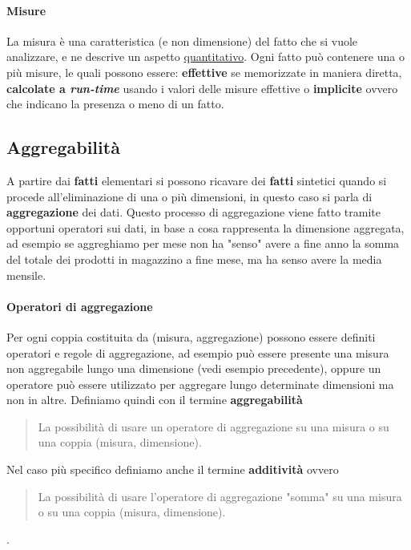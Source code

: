         \paragraph{Misure} La misura è una caratteristica (e non dimensione) del fatto che si vuole analizzare, e ne descrive un aspetto \underline{quantitativo}. Ogni fatto può contenere una o più misure, le quali possono essere: \textbf{effettive} se memorizzate in maniera diretta, \textbf{calcolate a \textit{run-time}} usando i valori delle misure effettive o \textbf{implicite} ovvero che indicano la presenza o meno di un fatto.
    \subsection{Aggregabilità} 
        A partire dai \textbf{fatti} elementari si possono ricavare dei \textbf{fatti} sintetici quando si procede all'eliminazione di una o più dimensioni, in questo caso si parla di \textbf{aggregazione} dei dati. Questo processo di aggregazione viene fatto tramite opportuni operatori sui dati, in base a cosa rappresenta la dimensione aggregata, ad esempio se aggreghiamo per mese non ha "senso" avere a fine anno la somma del totale dei prodotti in magazzino a fine mese, ma ha senso avere la media mensile.
        \paragraph{Operatori di aggregazione} Per ogni coppia costituita da (misura, aggregazione) possono essere definiti operatori e regole di aggregazione, ad esempio può essere presente una misura non aggregabile lungo una dimensione (vedi esempio precedente), oppure un operatore può essere utilizzato per aggregare lungo determinate dimensioni ma non in altre. Definiamo quindi con il termine \textbf{aggregabilità} \begin{quote}
            La possibilità di usare un operatore di aggregazione su una misura o su una coppia (misura, dimensione).
        \end{quote}
        Nel caso più specifico definiamo anche il termine \textbf{additività} ovvero \begin{quote}
            La possibilità di usare l'operatore di aggregazione "somma" su una misura o su una coppia (misura, dimensione).
        \end{quote}.
